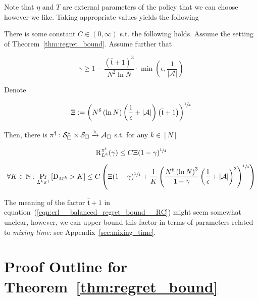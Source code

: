 \documentclass[anon,12pt]{colt2018} %
\newcommand{\AP}[1]{\left(#1\right)}
\newcommand{\AB}[1]{\left[#1\right]}
\newcommand{\Pa}[2]{\underset{#1}{\operatorname{Pr}}\AB{#2}}
\newcommand{\Nats}{\mathbb{N}}
\newcommand{\Abs}[1]{\left\vert #1 \right\vert}
\newcommand{\K}{\xrightarrow{\textnormal{k}}}
\newcommand{\A}{\mathcal{A}}
\newcommand{\St}{\mathcal{S}}
\newcommand{\Rg}{\operatorname{R}}
\newcommand{\MP}[2]{#1#2}
\newcommand{\Tn}{\mathfrak{t}}
\newcommand{\ND}{\operatorname{D}}
\newcommand{\RC}{\Xi}
\begin{document}
Note that $\eta$ and $T$ are external parameters of the policy that we can choose however we like. Taking appropriate values yields the following

\begin{samepage}
\begin{corollary}
\label{crl:balanced_regret_bound}

There is some constant $C \in (0,\infty)$ s.t. the following holds. Assume the setting of Theorem~\ref{thm:regret_bound}. Assume further that 

\begin{equation}
\gamma \geq 1 - \frac{\AP{\bar{\Tn}+1}^3}{N^2 \ln{N}}\cdot\min\AP{\epsilon,\frac{1}{\Abs{\A}}}
\end{equation}

Denote

\begin{equation}
\label{eqn:crl__balanced_regret_bound__RC}
\RC:=\AP{N^6 \AP{\ln N} \AP{\frac{1}{\epsilon}+\Abs{\A}}\AP{\bar{\Tn}+1}}^{\sfrac{1}{4}}
\end{equation}

Then, there is $\pi^\dagger: \St_\square^* \times \St_\square \K \A_\square$ s.t. for any $k\in[N]$

\begin{equation}
\label{eqn:crl__balanced_regret_bound__regret}
\Rg_{L^k}^{\pi^\dagger}(\gamma) \leq C\RC(1-\gamma)^{\sfrac{1}{4}}%
\end{equation}

\begin{equation}
\label{eqn:crl__balanced_regret_bound__delegations}
\forall K \in \Nats: \Pa{\MP{L^k}{\pi^\dagger}}{\ND_{M^k} > K} \leq C\AP{\Xi(1-\gamma)^{\sfrac{1}{4}}+\frac{1}{K}\AP{\frac{N^6\AP{\ln{N}}^3}{1-\gamma}\AP{\frac{1}{\epsilon}+\Abs{\A}}^3}^{\sfrac{1}{4}}}
\end{equation}

\end{corollary}
\end{samepage}

The meaning of the factor $\bar{\Tn}+1$ in equation~(\ref{eqn:crl__balanced_regret_bound__RC}) might seem somewhat unclear, however, we can upper bound this factor in terms of parameters related to \emph{mixing time}: see Appendix~\ref{sec:mixing_time}. 

\section{Proof Outline for Theorem~\ref{thm:regret_bound}}
\end{document}
